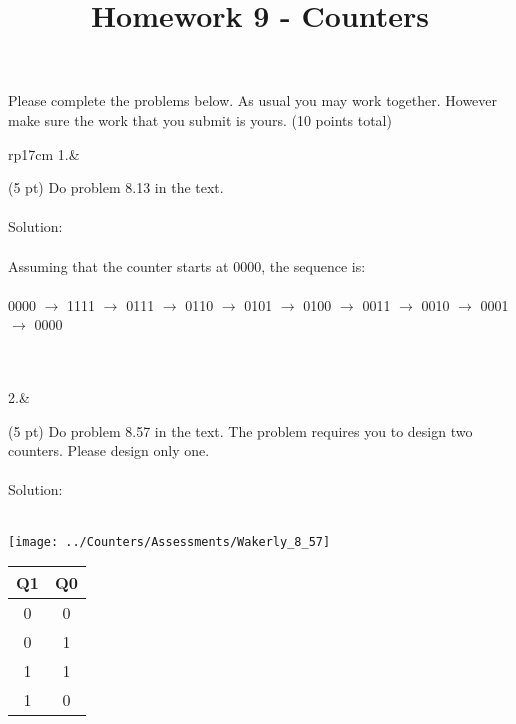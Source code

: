 \documentclass{article}
\title{Homework 9 - Counters}
\date{}
\begin{document}
\maketitle
Please complete the problems below.  As usual you may work together.  However make sure the work that you submit is yours. (10 points total)
\begin{longtable}[l]{rp{17cm}}
1.&\begin{minipage}[t]{\linewidth}(5 pt) Do problem 8.13 in the text. \\ \\

Solution: \\ \\
Assuming that the counter starts at 0000, the sequence is: \\ \\
0000 $\rightarrow$ 1111 $\rightarrow$ 0111 $\rightarrow$ 0110 $\rightarrow$ 0101 $\rightarrow$ 0100 $\rightarrow$ 0011 $\rightarrow$ 0010 $\rightarrow$ 0001 $\rightarrow$ 0000 \\ \\
\end{minipage}\\
\medskip
2.&\begin{minipage}[t]{\linewidth}(5 pt) Do problem 8.57 in the text.  The problem requires you to design two counters.  Please design only one.\\ \\

Solution: \\ \\
\begin{center}
  \texttt{[image: ../Counters/Assessments/Wakerly\_8\_57]} \\
  \begin{tabular}{cc}
    \textbf{Q1} & \textbf{Q0} \\
    \hline
    0 & 0 \\
    0 & 1 \\
    1 & 1 \\
    1 & 0 \\
  \end{tabular}
\end{center}
\end{minipage}\\
\medskip
\end{longtable}
\end{document}
